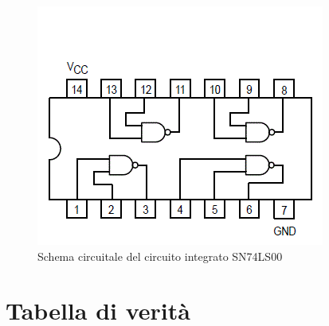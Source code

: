 \documentclass[10pt, a4paper, italian]{article}
\begin{document}
\begin{figure}[htbp]
\centering
    \includegraphics[width=\textwidth]{NAND}
    \caption{Schema circuitale del circuito integrato SN74LS00}
    \label{fig: NAND}
\end{figure}

\section{Tabella di verità}
\end{document}
